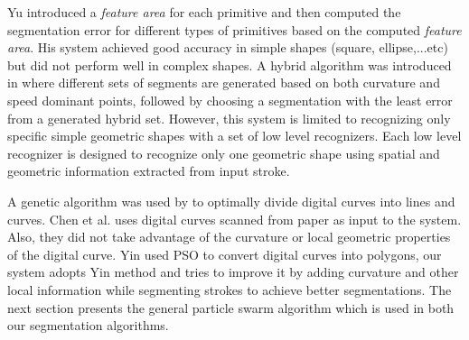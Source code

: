 \documentclass{article}
\begin{document}
Yu \cite{meanshift10} introduced a \textit{feature area} for each primitive and then computed the segmentation error for different types of primitives based on the computed \textit{feature area}. His system achieved good accuracy in simple shapes (square, ellipse,...etc) but did not perform well in complex shapes. A hybrid algorithm was introduced in \cite{earlyprocess} where different sets of segments are generated based on both curvature and speed dominant points, followed by choosing a segmentation with the least error from a generated hybrid set. However, this system is limited to recognizing only specific simple geometric shapes with a set of low level recognizers. Each low level recognizer is designed to recognize only one geometric shape using spatial and geometric information extracted from input stroke. 

A genetic algorithm was used by \cite{CruveDivisionSwarm} to optimally divide digital curves into lines and curves. Chen et al. \cite{CruveDivisionSwarm} uses digital curves scanned from paper as input to the system. Also, they did not take advantage of the curvature or local geometric properties of the digital curve. Yin \cite{PolygonApproximationPSO} used PSO to convert digital curves into polygons, our system adopts  Yin \cite{PolygonApproximationPSO} method and tries to improve it by adding curvature and other local information while segmenting strokes to achieve better segmentations. The next section presents the general particle swarm algorithm which is used in both our segmentation algorithms.

\end{document}
